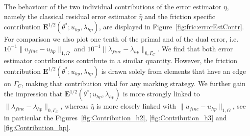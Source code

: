 \documentclass[12pt,twoside,reqno]{amsart}
\theoremstyle{definition}
\numberwithin{equation}{section}
\begin{document}
The behaviour of the two individual contributions of the error estimator $\eta$, namely the classical residual error estimator $\hat\eta$ and the friction specific contribution $\bm{E}^{1/2}(\theta^*; u_{hp},\lambda_{hp})$, are displayed in Figure~\ref{fig:fric:errorEstContr}.
For comparison we also plot one tenth of the primal and of the dual error, i.e.~$10^{-1}\|u_{fine}-u_{hp}\|_{1,\Omega}$ and $10^{-1}\|\lambda_{fine}-\lambda_{hp}\|_{0,\Gamma_C}$.
We find that both error estimator contributions contribute in a similar quantity. However, the friction contribution $\bm{E}^{1/2}(\theta^*; u_{hp},\lambda_{hp})$ is drawn solely from elements that have an edge on $\Gamma_C$, making that contribution vital for any marking strategy. We further gain the impression that $\bm{E}^{1/2}(\theta^*; u_{hp},\lambda_{hp})$ is more strongly linked to $\|\lambda_{fine}-\lambda_{hp}\|_{0,\Gamma_C}$, whereas $\hat\eta$ is more closely linked with
$\|u_{fine}-u_{hp}\|_{1,\Omega}$, see in particular the Figures~\ref{fig:Contribution_h2}, \ref{fig:Contribution_h3} and \ref{fig:Contribution_hp}.
\end{document}
